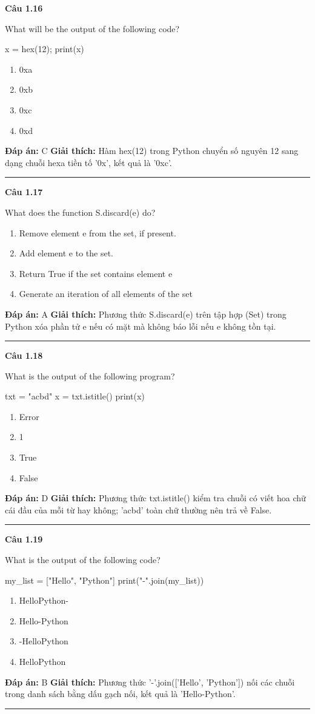 \documentclass[11pt,a4paper]{article}
\newenvironment{question}[1]{%
  \par\vspace{1em}\noindent\textbf{\large Câu #1}\par\vspace{0.4em}
}{%
  \par\vspace{1em}\hrule\vspace{0.6em}
}
\newenvironment{choices}{%
  \begin{enumerate}[label=\textbf{\Alph*.},leftmargin=2.2em,itemsep=2pt,topsep=3pt]
}{%
  \end{enumerate}
}
\newcommand{\choice}{\item}
\newenvironment{codebox}{%
  \begin{tcolorbox}[colback=gray!8!white,colframe=gray!50!black,arc=1.5mm,boxrule=0.6pt,left=3mm,right=3mm,top=2.5mm,bottom=2.5mm]
  \ttfamily\small
}{%
  \end{tcolorbox}
}
\begin{document}
\begin{question}{1.16}
What will be the output of the following code?
\begin{codebox}
x = hex(12);
print(x)
\end{codebox}
\begin{choices}
\choice 0xa
\choice 0xb
\choice 0xc
\choice 0xd
\end{choices}
\textbf{Đáp án:} C
\textbf{Giải thích:} Hàm hex(12) trong Python chuyển số nguyên 12 sang dạng chuỗi hexa tiền tố '0x', kết quả là '0xc'.
\end{question}

\begin{question}{1.17}
What does the function S.discard(e) do?
\begin{choices}
\choice Remove element e from the set, if present.
\choice Add element e to the set.
\choice Return True if the set contains element e
\choice Generate an iteration of all elements of the set
\end{choices}
\textbf{Đáp án:} A
\textbf{Giải thích:} Phương thức S.discard(e) trên tập hợp (Set) trong Python xóa phần tử e nếu có mặt mà không báo lỗi nếu e không tồn tại.
\end{question}

\begin{question}{1.18}
What is the output of the following program?
\begin{codebox}
txt = "acbd"
x = txt.istitle()
print(x)
\end{codebox}
\begin{choices}
\choice Error
\choice 1
\choice True
\choice False
\end{choices}
\textbf{Đáp án:} D
\textbf{Giải thích:} Phương thức txt.istitle() kiểm tra chuỗi có viết hoa chữ cái đầu của mỗi từ hay không; 'acbd' toàn chữ thường nên trả về False.
\end{question}

\begin{question}{1.19}
What is the output of the following code?
\begin{codebox}
my_list = ["Hello", "Python"]
print("-".join(my_list))
\end{codebox}
\begin{choices}
\choice HelloPython-
\choice Hello-Python
\choice -HelloPython
\choice HelloPython
\end{choices}
\textbf{Đáp án:} B
\textbf{Giải thích:} Phương thức '-'.join(['Hello', 'Python']) nối các chuỗi trong danh sách bằng dấu gạch nối, kết quả là 'Hello-Python'.
\end{question}
\end{document}
